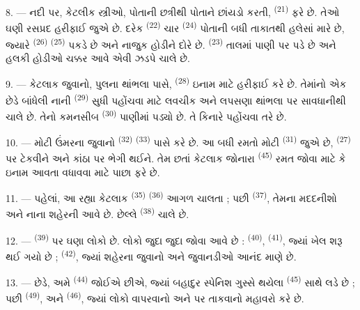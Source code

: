 \VUsaut{4.4mm}
\VUsaut{3.4mm}

8. --- નદી પર, કેટલીક સ્ત્રીઓ, પોતાની છત્રીથી પોતાને છાંયડો કરતી,
 \textsuperscript{(21)} ફરે છે. તેઓ ઘણી રસપ્રદ હરીફાઈ
જુએ છે. દરેક  \textsuperscript{(22)} ચાર
 \textsuperscript{(24)} પોતાની બધી તાકાતથી હલેસાં
મારે છે, જ્યારે  \textsuperscript{(26)}
 \textsuperscript{(25)} પકડે છે અને નાજુક હોડીને દોરે છે.
 \textsuperscript{(23)} તાલમાં પાણી પર પડે છે અને હલકી
હોડીઓ ચક્કર આવે એવી ઝડપે ચાલે છે.

9. --- કેટલાક જુવાનો, પુલના થાંભલા પાસે, 
\textsuperscript{(28)} ઇનામ માટે હરીફાઈ કરે છે. તેમાંનો એક છેડે બાંધેલી
નાની  \textsuperscript{(29)} સુધી પહોંચવા માટે લવચીક અને
લપસણા થાંભલા પર સાવધાનીથી ચાલે છે. તેનો કમનસીબ 
\textsuperscript{(30)} પાણીમાં પડ્યો છે. તે કિનારે પહોંચવા તરે છે.

10. --- મોટી ઉંમરના જુવાનો 
\textsuperscript{(32)}  \textsuperscript{(33)} પાસે કરે છે.
આ બધી રમતો મોટી  \textsuperscript{(31)} જુએ છે,
 \textsuperscript{(27)}  પર ટેકવીને અને
કાંઠા પર ભેગી થઈને. તેમ છતાં કેટલાક જોનારા 
\textsuperscript{(45)} રમત જોવા માટે કે ઇનામ  આવતા
 વધાવવા માટે પાછા ફરે છે.

11. --- પહેલાં, આ રહ્યા કેટલાક  \textsuperscript{(35)}
 \textsuperscript{(36)} આગળ ચાલતા ; પછી
 \textsuperscript{(37)}, તેમના મદદનીશો અને નાના શહેરની
 આવે છે. છેલ્લે 
\textsuperscript{(38)} ચાલે છે.

\VUsaut{5.0mm}
\VUsaut{3.6mm}

12. ---  \textsuperscript{(39)} પર ઘણા લોકો છે.
લોકો જુદા જુદા  જોવા આવે છે : 
\textsuperscript{(40)},  \textsuperscript{(41)}, જ્યાં ખેલ
શરૂ થઈ ગયો છે ;  \textsuperscript{(42)}, જ્યાં
શહેરના જુવાનો અને જુવાનડીઓ  આનંદ માણે છે.

13. --- છેડે, અમે  \textsuperscript{(44)} જોઈએ છીએ,
જ્યાં બહાદુર સ્પેનિશ  ગુસ્સે થયેલા 
\textsuperscript{(45)} સાથે લડે છે ; પછી 
\textsuperscript{(49)}, અને 
\textsuperscript{(46)}, જ્યાં લોકો  વાપરવાનો અને
 પર તાકવાનો મહાવરો કરે છે.

